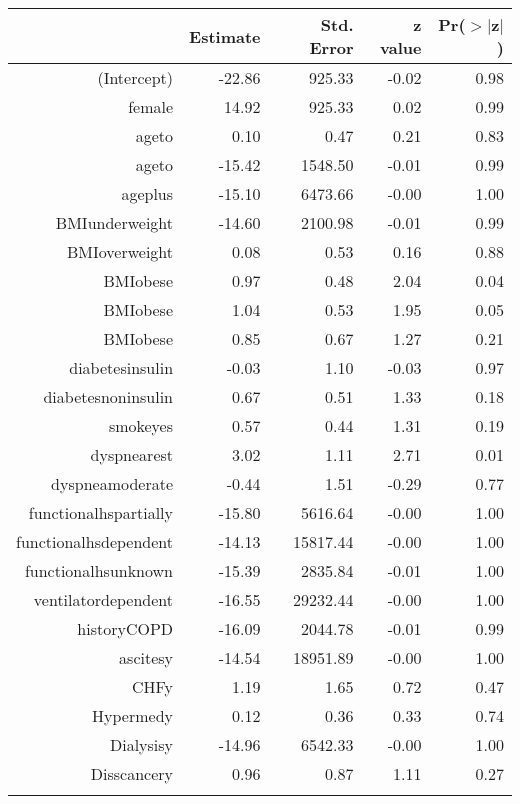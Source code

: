 \bigskip\bigskip
\centering
\begin{tabular}{rrrrr}
  \hline
 & Estimate & Std. Error & z value & Pr($>$$|$z$|$) \\ 
  \hline
(Intercept) & -22.86 & 925.33 & -0.02 & 0.98 \\ 
  female & 14.92 & 925.33 & 0.02 & 0.99 \\ 
  age\-65\-to\-74 & 0.10 & 0.47 & 0.21 & 0.83 \\ 
  age\-75\-to\-84 & -15.42 & 1548.50 & -0.01 & 0.99 \\ 
  age\-85\-plus & -15.10 & 6473.66 & -0.00 & 1.00 \\ 
  BMI\-underweight & -14.60 & 2100.98 & -0.01 & 0.99 \\ 
  BMI\-overweight & 0.08 & 0.53 & 0.16 & 0.88 \\ 
  BMI\-obese\-1 & 0.97 & 0.48 & 2.04 & 0.04 \\ 
  BMI\-obese\-2 & 1.04 & 0.53 & 1.95 & 0.05 \\ 
  BMI\-obese\-3 & 0.85 & 0.67 & 1.27 & 0.21 \\ 
  diabetes\-insulin & -0.03 & 1.10 & -0.03 & 0.97 \\ 
  diabetes\-noninsulin & 0.67 & 0.51 & 1.33 & 0.18 \\ 
  smoke\-yes & 0.57 & 0.44 & 1.31 & 0.19 \\ 
  dyspnea\-rest & 3.02 & 1.11 & 2.71 & 0.01 \\ 
  dyspnea\-moderate & -0.44 & 1.51 & -0.29 & 0.77 \\ 
  functional\-hs\-partially & -15.80 & 5616.64 & -0.00 & 1.00 \\ 
  functional\-hs\-dependent & -14.13 & 15817.44 & -0.00 & 1.00 \\ 
  functional\-hs\-unknown & -15.39 & 2835.84 & -0.01 & 1.00 \\ 
  ventilator\-dependent & -16.55 & 29232.44 & -0.00 & 1.00 \\ 
  history\-COPD & -16.09 & 2044.78 & -0.01 & 0.99 \\ 
  ascites\-y & -14.54 & 18951.89 & -0.00 & 1.00 \\ 
  CHF\-y & 1.19 & 1.65 & 0.72 & 0.47 \\ 
  Hyper\-med\-y & 0.12 & 0.36 & 0.33 & 0.74 \\ 
  Dialysis\-y & -14.96 & 6542.33 & -0.00 & 1.00 \\ 
  Diss\-cancer\-y & 0.96 & 0.87 & 1.11 & 0.27 \\ 
$$
\end{tabular}

